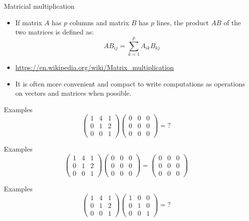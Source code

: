 \documentclass[usenames,dvipsnames]{beamer}
\begin{document}
\begin{frame}{Matricial multiplication}
    \begin{itemize}
        \item If matrix $A$ has $p$ columns and matrix $B$ has $p$ lines, the
            product $AB$ of the two matrices is defined as:
            \begin{equation}
                AB_{ij}= \sum^{p}_{k=1} A_{ik}B_{kj}
            \end{equation}
	\item \url{https://en.wikipedia.org/wiki/Matrix_multiplication}
        \item It is often more convenient and compact to write computations as operations on vectors and matrices when possible.
    \end{itemize}
\end{frame}

\begin{frame}{Examples}
   \[
\begin{pmatrix}
1 & 4 & 1 \\
0 & 1 & 2 \\
0 & 0 & 1
\end{pmatrix}
\begin{pmatrix}
0 & 0 & 0 \\
0 & 0 & 0 \\
0 & 0 & 0
\end{pmatrix}
    =\text{?} 
\] 
\end{frame}

\begin{frame}{Examples}
   \[
\begin{pmatrix}
1 & 4 & 1 \\
0 & 1 & 2 \\
0 & 0 & 1
\end{pmatrix}
\begin{pmatrix}
0 & 0 & 0 \\
0 & 0 & 0 \\
0 & 0 & 0
\end{pmatrix}
    =
\begin{pmatrix}
0 & 0 & 0 \\
0 & 0 & 0 \\
0 & 0 & 0
\end{pmatrix}
\] 
\end{frame}


\begin{frame}{Examples}
   \[
\begin{pmatrix}
1 & 4 & 1 \\
0 & 1 & 2 \\
0 & 0 & 1
\end{pmatrix}
\begin{pmatrix}
1 & 0 & 0 \\
0 & 1 & 0 \\
0 & 0 & 1
\end{pmatrix}
    =\text{?} 
\] 
\end{frame}
\end{document}
